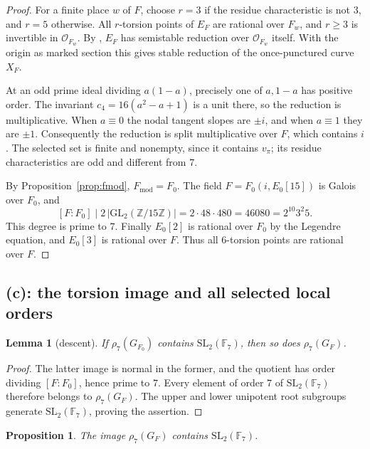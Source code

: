 \documentclass[11pt]{article}
\theoremstyle{plain}
\newtheorem{proposition}[theorem]{Proposition}
\newtheorem{lemma}[theorem]{Lemma}
\theoremstyle{definition}
\newcommand{\Fmod}{F_{\mathrm{mod}}}
\begin{document}
\begin{proof}
For a finite place $w$ of $F$, choose $r=3$ if the residue characteristic is
not $3$, and $r=5$ otherwise. All $r$-torsion points of $E_F$ are rational
over $F_w$, and $r\ge3$ is invertible in $\mathcal O_{F_w}$.
By \cite[Proposition 1.8(v)]{IUT4}, $E_F$ has semistable reduction over
$\mathcal O_{F_w}$ itself. With the origin as marked section this gives
stable reduction of the once-punctured curve $X_F$.

At an odd prime ideal dividing $a(1-a)$, precisely one of $a,1-a$ has
positive order. The invariant $c_4=16(a^2-a+1)$ is a unit there, so the
reduction is multiplicative. When $a\equiv0$ the nodal tangent slopes
are $\pm i$, and when $a\equiv1$ they are $\pm1$.
Consequently the reduction is split multiplicative over $F$, which contains
$i$. The selected set is finite and nonempty, since it contains $v_\pi$;
its residue characteristics are odd and different from $7$.

By Proposition~\ref{prop:fmod}, $\Fmod=F_0$. The field
$F=F_0(i,E_0[15])$ is Galois over $F_0$, and
\[
 [F:F_0]\mid 2\,|\mathrm{GL}_2(\mathbb Z/15\mathbb Z)|
 =2\cdot48\cdot480=46080=2^{10}3^2 5.
\]
This degree is prime to $7$.
Finally $E_0[2]$ is rational over $F_0$ by the Legendre equation, and
$E_0[3]$ is rational over $F$. Thus all $6$-torsion points are rational over $F$.
\end{proof}

\subsection{(c): the torsion image and all selected local orders}

\begin{lemma}[descent]\label{lem:descent}
If $\rho_7(G_{F_0})$ contains $\mathrm{SL}_2(\mathbb F_7)$, then so does
$\rho_7(G_F)$.
\end{lemma}

\begin{proof}
The latter image is normal in the former, and the quotient has order dividing
$[F:F_0]$, hence prime to $7$. Every element of order $7$ of
$\mathrm{SL}_2(\mathbb F_7)$ therefore belongs to $\rho_7(G_F)$.
The upper and lower unipotent root subgroups generate
$\mathrm{SL}_2(\mathbb F_7)$, proving the assertion.
\end{proof}

\begin{proposition}\label{prop:sl2}
The image $\rho_7(G_F)$ contains $\mathrm{SL}_2(\mathbb F_7)$.
\end{proposition}
\end{document}

